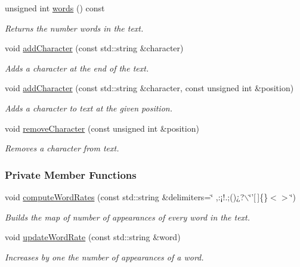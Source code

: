 \begin{CompactItemize}
unsigned int \hyperlink{class_text_edfd71af7802a2d72eed7365f081a66d}{words} () const 
\begin{CompactList}\small\item\em Returns the number words in the text. \item\end{CompactList}\item 
void \hyperlink{class_text_d2c0cb733cef33657a44e4efc9e518ee}{addCharacter} (const std::string \&character)
\begin{CompactList}\small\item\em Adds a character at the end of the text. \item\end{CompactList}\item 
void \hyperlink{class_text_585f0fde5ef0796ccde09a059d90cc3b}{addCharacter} (const std::string \&character, const unsigned int \&position)
\begin{CompactList}\small\item\em Adds a character to text at the given position. \item\end{CompactList}\item 
void \hyperlink{class_text_e04500eeada2a4a3bb00554b32263c52}{removeCharacter} (const unsigned int \&position)
\begin{CompactList}\small\item\em Removes a character from text. \item\end{CompactList}\end{CompactItemize}
\subsubsection*{Private Member Functions}
\begin{CompactItemize}
\item 
void \hyperlink{class_text_e954a35628c72537e2ee5ca6e9609ac1}{computeWordRates} (const std::string \&delimiters=\char`\"{} ,:¡!.;()¿?$\backslash$\char`\"{}'\mbox{[}$\,$\mbox{]}\{\}$<$$>$\char`\"{})
\begin{CompactList}\small\item\em Builds the map of number of appearances of every word in the text. \item\end{CompactList}\item 
void \hyperlink{class_text_5ab8f9bfa566de537a167991fe10eff5}{updateWordRate} (const std::string \&word)
\begin{CompactList}\small\item\em Increases by one the number of appearances of a word. \item\end{CompactList}\end{CompactItemize}
